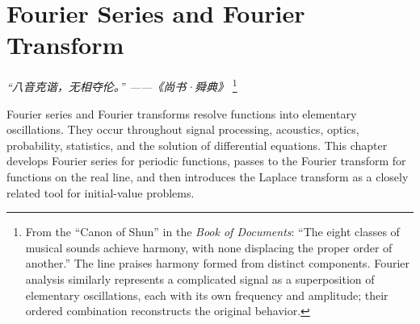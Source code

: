 \chapter{Fourier Series and Fourier Transform}
\renewcommand{\currentchapterpath}{chapters/ch05/}

\begin{flushright}
\textit{“八音克谐，无相夺伦。” ——《尚书·舜典》}
\footnote{From the ``Canon of Shun'' in the \textit{Book of Documents}: ``The eight classes of musical sounds achieve harmony, with none displacing the proper order of another.'' The line praises harmony formed from distinct components. Fourier analysis similarly represents a complicated signal as a superposition of elementary oscillations, each with its own frequency and amplitude; their ordered combination reconstructs the original behavior.}
\end{flushright}

Fourier series and Fourier transforms resolve functions into elementary oscillations. They occur throughout signal processing, acoustics, optics, probability, statistics, and the solution of differential equations. This chapter develops Fourier series for periodic functions, passes to the Fourier transform for functions on the real line, and then introduces the Laplace transform as a closely related tool for initial-value problems.

